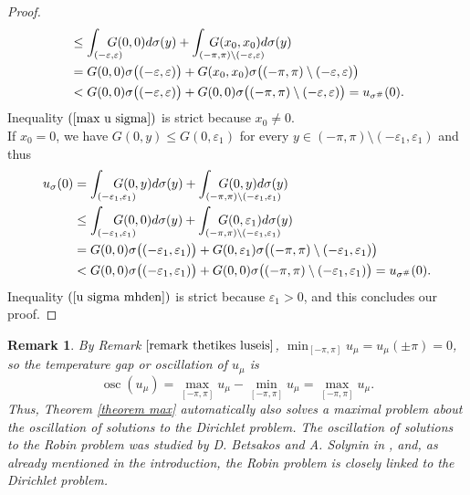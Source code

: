 \documentclass[11pt]{amsart}
\newtheorem{remark}[theorem]{Remark}
\numberwithin{equation}{section}
\begin{document}
\begin{proof}
\begin{align}
\nonumber&\leq\int_{(-\varepsilon,\varepsilon)} \kern-0.5cm G(0,0)d\sigma(y)+\int_{(-\pi,\pi)\setminus(-\varepsilon,\varepsilon)}\kern-1.6cmG(x_0,x_0)d\sigma(y)\\
\nonumber&=G(0,0)\sigma\bigl((-\varepsilon,\varepsilon)\bigr)+G(x_0,x_0)\sigma\bigl((-\pi,\pi)\setminus(-\varepsilon,\varepsilon)\bigr)\\
\label{max u sigma}&<G(0,0)\sigma\bigl((-\varepsilon,\varepsilon)\bigr)+G(0,0)\sigma\bigl((-\pi,\pi)\setminus(-\varepsilon,\varepsilon)\bigr)=u_{\sigma^\#}(0).
\end{align}
Inequality \((\ref{max u sigma})\) is strict because \(x_0\neq0.\)\\
If \(x_0=0\), we have \(G(0,y)\leq G(0,\varepsilon_1)\) for every \(y\in(-\pi,\pi)\setminus(-\varepsilon_1,\varepsilon_1)\) and thus
\begin{align}
\nonumber u_\sigma(0)&=\int_{(-\varepsilon_1,\varepsilon_1)} \kern-0.7cm G(0,y)d\sigma(y)+\int_{(-\pi,\pi)\setminus(-\varepsilon_1,\varepsilon_1)}\kern-1.8cmG(0,y)d\sigma(y)\\
\nonumber&\leq\int_{(-\varepsilon_1,\varepsilon_1)} \kern-0.7cm G(0,0)d\sigma(y)+\int_{(-\pi,\pi)\setminus(-\varepsilon_1,\varepsilon_1)}\kern-1.8cmG(0,\varepsilon_1)d\sigma(y)\\
\nonumber&=G(0,0)\sigma\bigl((-\varepsilon_1,\varepsilon_1)\bigr)+G(0,\varepsilon_1)\sigma\bigl((-\pi,\pi)\setminus(-\varepsilon_1,\varepsilon_1)\bigr)\\
\label{u sigma mhden}&<G(0,0)\sigma\bigl((-\varepsilon_1,\varepsilon_1)\bigr)+G(0,0)\sigma\bigl((-\pi,\pi)\setminus(-\varepsilon_1,\varepsilon_1)\bigr)=u_{\sigma^\#}(0).
\end{align}
Inequality \((\ref{u sigma mhden})\) is strict because \(\varepsilon_1>0\), and this concludes our proof.
\end{proof}
\begin{remark}
\textnormal{By Remark \(\ref{remark thetikes luseis}\), \(\displaystyle\min_{[-\pi,\pi]} u_\mu=u_\mu(\pm\pi)=0\), so the temperature gap or oscillation of \(u_\mu\) is
\begin{equation}
\operatorname{osc}(u_\mu)=\max_{[-\pi,\pi]}u_\mu-\min_{[-\pi,\pi]}u_\mu=\max_{[-\pi,\pi]}u_\mu.
\end{equation}
Thus, Theorem \textnormal{\ref{theorem max}} automatically also solves a maximal problem about the oscillation of solutions to the Dirichlet problem.
The oscillation of solutions to the Robin problem was studied by D. Betsakos and A. Solynin in \textnormal{\cite{Betsakos}}, and, as already mentioned in the introduction, the Robin problem is closely linked to the Dirichlet problem.}
\end{remark}
\end{document}

